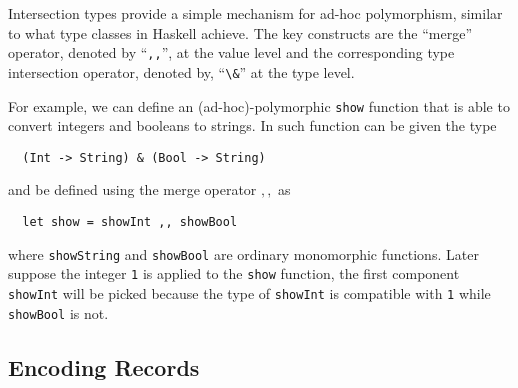 \documentclass[preprint]{sigplanconf}
\begin{document}
Intersection types provide a simple mechanism for ad-hoc polymorphism, similar
to what type classes in Haskell achieve. The key constructs are the ``merge''
operator, denoted by ``\lstinline{,,}'', at the value level and the corresponding type
intersection operator, denoted by, ``\lstinline{\&}'' at the type level.

For example, we can define an (ad-hoc)-polymorphic \lstinline{show} function
that is able to convert integers and booleans to strings. In \name such function
can be given the type
\begin{lstlisting}
  (Int -> String) & (Bool -> String)
\end{lstlisting}
and be defined using the merge operator $ ,, $ as
\begin{lstlisting}
  let show = showInt ,, showBool
\end{lstlisting}
where \lstinline{showString} and \lstinline{showBool} are ordinary monomorphic
functions. Later suppose the integer \lstinline{1} is applied to the \lstinline{show} function,
the first component \lstinline{showInt} will be picked because the type of \lstinline{showInt}
is compatible with \lstinline{1} while \lstinline{showBool} is not.








\subsection{Encoding Records}
\end{document}
